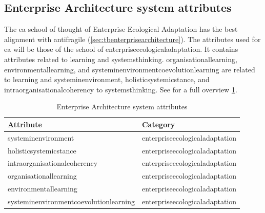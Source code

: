 \subsection{Enterprise Architecture system attributes}
\label{sub:attributesonea}
The \acrlong{ea} school of thought of Enterprise Ecological Adaptation has the best alignment with \gls{antifragile} (\cref{sec:tbenterprisearchitecture}). The \glspl{attribute} used for \acrlong{ea} will be those of the school of \gls{enterpriseecologicaladaptation}.  It contains \glspl{attribute} related to learning and \gls{systemsthinking}. \Gls{organisationallearning}, \gls{environmentallearning}, and \gls{systeminenvironmentcoevolutionlearning} are related to learning and \gls{systeminenvironment}, \gls{holisticsystemicstance}, and \gls{intraorganisationalcoherency} to \gls{systemsthinking}. See for a full overview \cref{tab:attributesofeea}.
\begin{longtable}{@{}p{}p{}@{}}
	\toprule%
	\textbf{Attribute} & \textbf{Category} \\%
	\midrule%
	\endhead%
	\hline
	\endfoot%
	\caption[Enterprise Architecture system attributes]{Enterprise Architecture system attributes}
	\label{tab:attributesofeea}
	\endlastfoot%
	\Gls{systeminenvironment} & \Gls{enterpriseecologicaladaptation} \\%
	\Gls{holisticsystemicstance} & \Gls{enterpriseecologicaladaptation} \\%
	\Gls{intraorganisationalcoherency} & \Gls{enterpriseecologicaladaptation} \\%
	\Gls{organisationallearning} & \Gls{enterpriseecologicaladaptation} \\%
	\Gls{environmentallearning} & \Gls{enterpriseecologicaladaptation} \\%
	\Gls{systeminenvironmentcoevolutionlearning} & \Gls{enterpriseecologicaladaptation} \\%
	\bottomrule%
\end{longtable}
